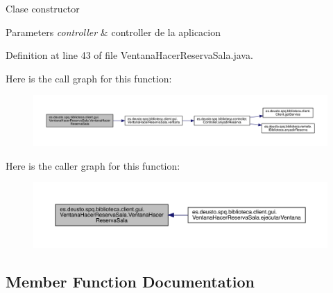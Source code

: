 Clase constructor 
\begin{DoxyParams}{Parameters}
{\em controller} & controller de la aplicacion \\
\hline
\end{DoxyParams}


Definition at line 43 of file Ventana\+Hacer\+Reserva\+Sala.\+java.

Here is the call graph for this function\+:
\nopagebreak
\begin{figure}[H]
\begin{center}
\leavevmode
\includegraphics[width=350pt]{classes_1_1deusto_1_1spq_1_1biblioteca_1_1client_1_1gui_1_1_ventana_hacer_reserva_sala_a312e60fcf20cddaffeb9797a117c5cb9_cgraph}
\end{center}
\end{figure}
Here is the caller graph for this function\+:
\nopagebreak
\begin{figure}[H]
\begin{center}
\leavevmode
\includegraphics[width=350pt]{classes_1_1deusto_1_1spq_1_1biblioteca_1_1client_1_1gui_1_1_ventana_hacer_reserva_sala_a312e60fcf20cddaffeb9797a117c5cb9_icgraph}
\end{center}
\end{figure}


\subsection{Member Function Documentation}
\mbox{\label{classes_1_1deusto_1_1spq_1_1biblioteca_1_1client_1_1gui_1_1_ventana_hacer_reserva_sala_aa0a71df04faefeef13b6b7ed91eff04f}} 

